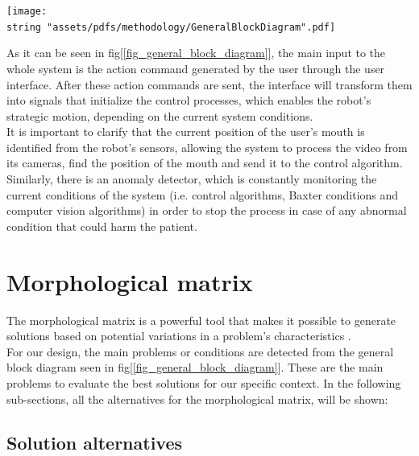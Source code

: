 \documentclass[11pt]{report} %
\begin{document}
\begin{center}
\texttt{[image: \\string "assets/pdfs/methodology/GeneralBlockDiagram".pdf]}
\bigbreak
\begin{minipage}{\linewidth} %
\label{fig_general_block_diagram}
\end{minipage} \end{center}

As it can be seen in fig[\ref{fig_general_block_diagram}], the main input to the whole system is the action command generated by the user through the user interface. After these action commands are sent, the interface will transform them into signals that initialize the control processes, which enables the robot's strategic motion, depending on the current system conditions.\\

It is important to clarify that the current position of the user's mouth is identified from the robot's sensors, allowing the system to process the video from its cameras, find the position of the mouth and send it to the control algorithm.\\

Similarly, there is an anomaly detector, which is constantly monitoring the current conditions of the system (i.e. control algorithms, Baxter conditions and computer vision algorithms) in order to stop the process in case of any abnormal condition that could harm the patient.\\


\section{Morphological matrix}

The morphological matrix is a powerful tool that makes it possible to generate solutions based on potential variations in a problem's characteristics \citep{cite_morphological_matrix}.\\

For our design, the main problems or conditions are detected from the general block diagram seen in fig[\ref{fig_general_block_diagram}]. These are the main problems to evaluate the best solutions for our specific context. In the following sub-sections, all the alternatives for the morphological matrix, will be shown:

\subsection{Solution alternatives}
\end{document}

